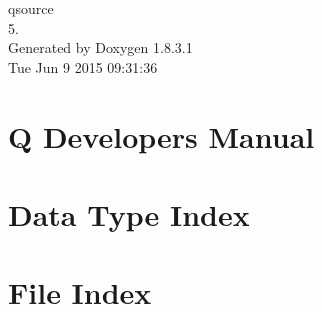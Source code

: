 \documentclass{article}
\begin{document}
\hypersetup{pageanchor=false,citecolor=blue}
\begin{titlepage}
\vspace*{7cm}
\begin{center}
{\Large qsource \\[1ex]\large 5. }\\
\vspace*{1cm}
{\large Generated by Doxygen 1.8.3.1}\\
\vspace*{0.5cm}
{\small Tue Jun 9 2015 09:31:36}\\
\end{center}
\end{titlepage}
\tableofcontents
{}
\hypersetup{pageanchor=true,citecolor=blue}
\section{Q Developers Manual}
\label{index}\hypertarget{index}{}
\section{Data Type Index}

\section{File Index}

\end{document}
